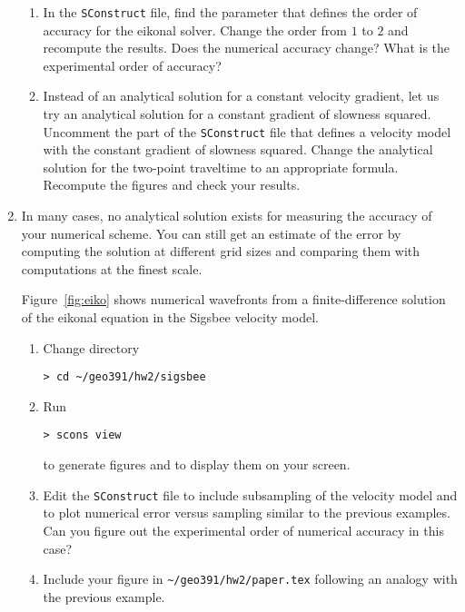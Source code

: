 \begin{enumerate}
\begin{enumerate}
  \item In the \texttt{SConstruct} file, find the parameter that
    defines the order of accuracy for the eikonal solver. Change the
    order from $1$ to $2$ and recompute the results. Does the
    numerical accuracy change? What is the experimental order of
    accuracy? 
  \item Instead of an analytical solution for a constant velocity
    gradient, let us try an analytical solution for a constant
    gradient of slowness squared. Uncomment the part of the
    \texttt{SConstruct} file that defines a velocity model with the
    constant gradient of slowness squared. Change the analytical
    solution for the two-point traveltime to an appropriate formula.
    Recompute the figures and check your results.
  \end{enumerate}

\item In many cases, no analytical solution exists for measuring the
  accuracy of your numerical scheme. You can still get an estimate of
  the error by computing the solution at different grid sizes and
  comparing them with computations at the finest scale.


  {\small
    
  }

  Figure~\ref{fig:eiko} shows numerical wavefronts from a
  finite-difference solution of the eikonal equation in the Sigsbee
  velocity model.


  \begin{enumerate}    
  \item Change directory 
\begin{verbatim}
> cd ~/geo391/hw2/sigsbee
\end{verbatim}
  \item Run
\begin{verbatim}
> scons view
\end{verbatim}
    to generate figures and to display them on your screen.
  
  \item Edit the \texttt{SConstruct} file to include subsampling of
    the velocity model and to plot numerical error versus sampling
    similar to the previous examples. Can you figure out the
    experimental order of numerical accuracy in this case?
    
  \item Include your figure in \verb#~/geo391/hw2/paper.tex# following
    an analogy with the previous example.

  \end{enumerate}
  
\end{enumerate}


